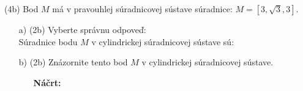 \pr (4b) Bod $M$ má v pravouhlej súradnicovej sústave súradnice:  $M=[3,\sqrt{3}, 3]$.

\begin{enumerate}
\item[a)] (2b) Vyberte správnu odpoveď:\\
Súradnice bodu $M$ v cylindrickej súradnicovej sústave sú:


\noindent
\begin{itemize}
\end{itemize}


\item[b)] (2b) Znázornite tento bod $M$ v cylindrickej súradnicovej sústave.

\begin{enumerate}
\item[]\textbf{Náčrt:}
\end{enumerate}
\end{enumerate}

\newpage

\bigskip

